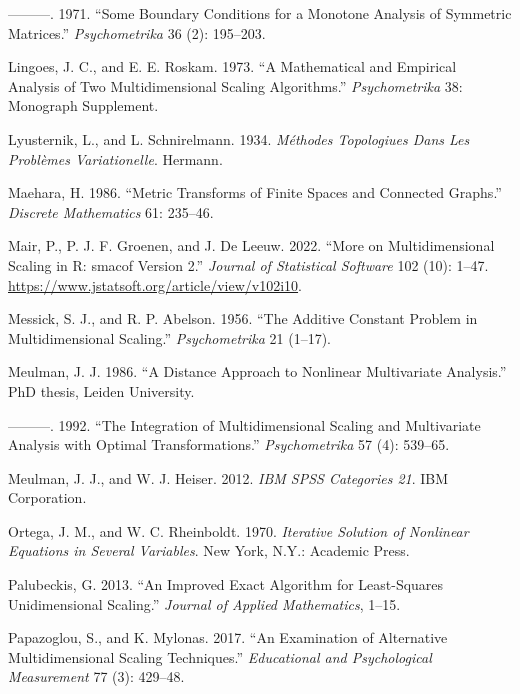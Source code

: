 \documentclass[
  12pt,
  letterpaper,
  DIV=11,
  numbers=noendperiod]{scrreprt}
\newlength{\cslhangindent}
\newenvironment{CSLReferences}[2] %
 {\begin{list}{}{%
  \setlength{\itemindent}{0pt}
  \setlength{\leftmargin}{0pt}
  \setlength{\parsep}{0pt}
  \ifodd #1
   \setlength{\leftmargin}{\cslhangindent}
   \setlength{\itemindent}{-1\cslhangindent}
  \fi
  \setlength{\itemsep}{#2\baselineskip}}}
 {\end{list}}
\theoremstyle{remark}
\begin{document}
\begin{CSLReferences}{1}{0}
---------. 1971. {``{Some Boundary Conditions for a Monotone Analysis of
Symmetric Matrices}.''} \emph{Psychometrika} 36 (2): 195--203.

Lingoes, J. C., and E. E. Roskam. 1973. {``{A Mathematical and Empirical
Analysis of Two Multidimensional Scaling Algorithms}.''}
\emph{Psychometrika} 38: Monograph Supplement.

Lyusternik, L., and L. Schnirelmann. 1934. \emph{M{é}thodes Topologiues
Dans Les Probl{è}mes Variationelle}. Hermann.

Maehara, H. 1986. {``{Metric Transforms of Finite Spaces and Connected
Graphs}.''} \emph{Discrete Mathematics} 61: 235--46.

Mair, P., P. J. F. Groenen, and J. De Leeuw. 2022. {``{More on
Multidimensional Scaling in R: smacof Version 2}.''} \emph{Journal of
Statistical Software} 102 (10): 1--47.
\url{https://www.jstatsoft.org/article/view/v102i10}.

Messick, S. J., and R. P. Abelson. 1956. {``{The Additive Constant
Problem in Multidimensional Scaling}.''} \emph{Psychometrika} 21
(1--17).

Meulman, J. J. 1986. {``{A Distance Approach to Nonlinear Multivariate
Analysis}.''} PhD thesis, Leiden University.

---------. 1992. {``{The Integration of Multidimensional Scaling and
Multivariate Analysis with Optimal Transformations}.''}
\emph{Psychometrika} 57 (4): 539--65.

Meulman, J. J., and W. J. Heiser. 2012. \emph{IBM SPSS Categories 21}.
IBM Corporation.

Ortega, J. M., and W. C. Rheinboldt. 1970. \emph{{Iterative Solution of
Nonlinear Equations in Several Variables}}. New York, N.Y.: Academic
Press.

Palubeckis, G. 2013. {``{An Improved Exact Algorithm for Least-Squares
Unidimensional Scaling}.''} \emph{Journal of Applied Mathematics},
1--15.

Papazoglou, S., and K. Mylonas. 2017. {``{An Examination of Alternative
Multidimensional Scaling Techniques}.''} \emph{Educational and
Psychological Measurement} 77 (3): 429--48.


\end{CSLReferences}
\end{document}
